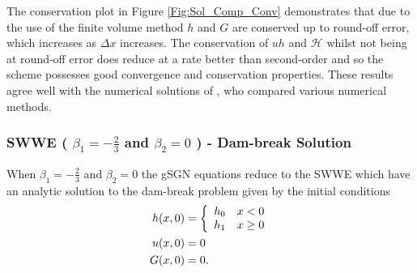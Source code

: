 \documentclass[10pt]{elsarticle}
\begin{document}
%
The conservation plot in Figure \ref{Fig:Sol_Comp_Conv} demonstrates that due to the use of the finite volume method $h$ and $G$ are conserved up to round-off error, which increases as $\Delta x$ increases. The conservation of $uh$ and $\mathcal{H}$ whilst not being at round-off error does reduce at a rate better than second-order and so the scheme possesses good convergence and conservation properties. These results agree well with the numerical solutions of \citet{Pitt-2019}, who compared various numerical methods. 

\subsubsection{SWWE ( $\beta_1= -\frac{2}{3}$ and $ \beta_2 =0$ ) - Dam-break Solution }
When $\beta_1= -\frac{2}{3}$ and $ \beta_2 =0$ the gSGN equations reduce to the SWWE which have an analytic solution to the dam-break problem given by the initial conditions
\begin{align}
h(x,0) & = \left\lbrace \begin{array}{c c}
h_0 & x < 0\\
h_1 & x \ge 0
\end{array} \right.  \\
u(x,0) &= 0 \\
G(x,0) &= 0.
\end{align}
\end{document}

